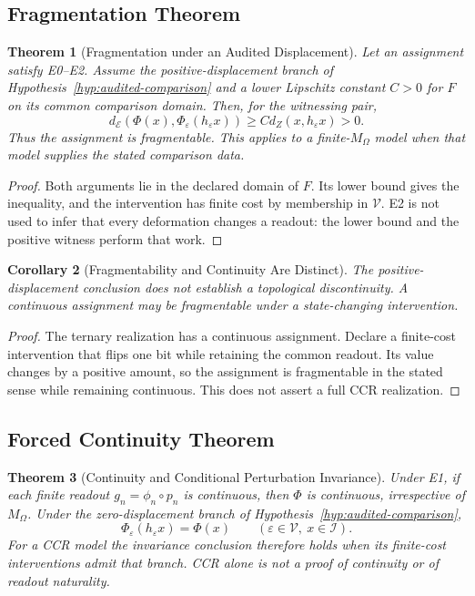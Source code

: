 \documentclass[11pt,a4paper]{article}
\theoremstyle{plain}
\newtheorem{theorem}{Theorem}[section]
\newtheorem{corollary}[theorem]{Corollary}
\theoremstyle{definition}
\theoremstyle{remark}
\begin{document}
\subsection{Fragmentation Theorem}

\begin{theorem}[Fragmentation under an Audited Displacement]\label{thm:fragmentation}
Let an assignment satisfy E0--E2. Assume the positive-displacement branch of Hypothesis~\ref{hyp:audited-comparison} and a lower Lipschitz constant $C>0$ for $F$ on its common comparison domain. Then, for the witnessing pair,
\[
d_{\mathcal E}(\Phi(x),\Phi_\varepsilon(h_\varepsilon x))\geq C d_Z(x,h_\varepsilon x)>0.
\]
Thus the assignment is fragmentable. This applies to a finite-$M_\Omega$ model when that model supplies the stated comparison data.
\end{theorem}

\begin{proof}
Both arguments lie in the declared domain of $F$. Its lower bound gives the inequality, and the intervention has finite cost by membership in $\mathcal V$. E2 is not used to infer that every deformation changes a readout: the lower bound and the positive witness perform that work.
\end{proof}

\begin{corollary}[Fragmentability and Continuity Are Distinct]
The positive-displacement conclusion does not establish a topological discontinuity. A continuous assignment may be fragmentable under a state-changing intervention.
\end{corollary}

\begin{proof}
The ternary realization has a continuous assignment. Declare a finite-cost intervention that flips one bit while retaining the common readout. Its value changes by a positive amount, so the assignment is fragmentable in the stated sense while remaining continuous. This does not assert a full CCR realization.
\end{proof}

\subsection{Forced Continuity Theorem}

\begin{theorem}[Continuity and Conditional Perturbation Invariance]\label{thm:forced-continuity}
Under E1, if each finite readout $g_n=\phi_n\circ p_n$ is continuous, then $\Phi$ is continuous, irrespective of $M_\Omega$. Under the zero-displacement branch of Hypothesis~\ref{hyp:audited-comparison},
\[
\Phi_\varepsilon(h_\varepsilon x)=\Phi(x)
\qquad(\varepsilon\in\mathcal V,\ x\in\mathcal I).
\]
For a CCR model the invariance conclusion therefore holds when its finite-cost interventions admit that branch. CCR alone is not a proof of continuity or of readout naturality.
\end{theorem}
\end{document}

